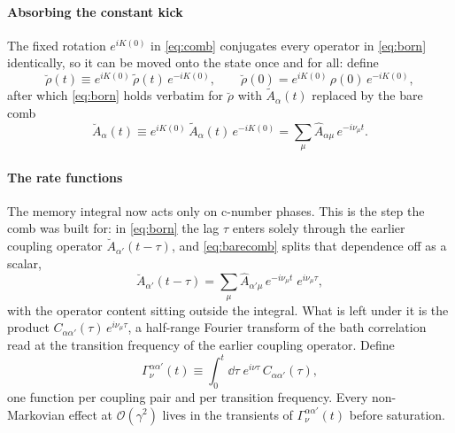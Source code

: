 \documentclass[a4paper,11pt]{article}
\begin{document}
\paragraph{Absorbing the constant kick}
The fixed rotation $e^{iK(0)}$ in \cref{eq:comb} conjugates every operator in \cref{eq:born} identically, so it can be moved onto the state once and for all: define
\begin{equation}\label{eq:breve}
  \breve\rho(t) \equiv e^{iK(0)}\,\tilde\rho(t)\,e^{-iK(0)},
  \qquad
  \breve\rho(0) = e^{iK(0)}\,\rho(0)\,e^{-iK(0)},
\end{equation}
after which \cref{eq:born} holds verbatim for $\breve\rho$ with $\tilde A_\alpha(t)$ replaced by the bare comb
\begin{equation}\label{eq:barecomb}
  \breve A_\alpha(t) \equiv e^{iK(0)}\,\tilde A_\alpha(t)\,e^{-iK(0)} = \sum_\mu \hat A_{\alpha\mu}\, e^{-i\nu_\mu t}.
\end{equation}

\paragraph{The rate functions}
The memory integral now acts only on c-number phases. This is the step the comb was built for: in \cref{eq:born} the lag $\tau$ enters solely through the earlier coupling operator $\breve A_{\alpha'}(t-\tau)$, and \cref{eq:barecomb} splits that dependence off as a scalar,
\begin{equation}\label{eq:lagphase}
  \breve A_{\alpha'}(t-\tau) = \sum_\mu \hat A_{\alpha'\mu}\, e^{-i\nu_\mu t}\; e^{i\nu_\mu \tau},
\end{equation}
with the operator content sitting outside the integral. What is left under it is the product $C_{\alpha\alpha'}(\tau)\,e^{i\nu_\mu\tau}$, a half-range Fourier transform of the bath correlation read at the transition frequency of the earlier coupling operator. Define
\begin{equation}\label{eq:rates}
  \Gamma^{\alpha\alpha'}_\nu(t) \equiv \int_0^t \dd\tau\;e^{i\nu\tau}\,C_{\alpha\alpha'}(\tau),
\end{equation}
one function per coupling pair and per transition frequency. Every non-Markovian effect at $\mathcal O(\gamma^2)$ lives in the transients of $\Gamma^{\alpha\alpha'}_\nu(t)$ before saturation.
\end{document}

